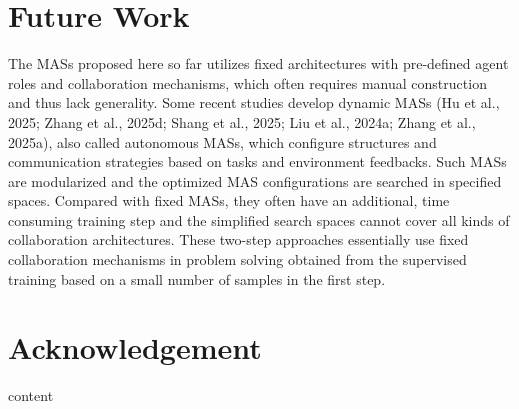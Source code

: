 \documentclass[conference]{IEEEtran}
\begin{document}
\section{Future Work}
The MASs proposed here so far utilizes fixed architectures with pre-defined agent roles and collaboration mechanisms, which often requires manual construction and thus lack generality.
Some recent studies develop dynamic MASs (Hu et al., 2025; Zhang et al., 2025d; Shang et al., 2025; Liu et al., 2024a; Zhang et 
al., 2025a), also called autonomous MASs, which configure structures and communication strategies based on tasks
and environment feedbacks. Such MASs are modularized and the optimized MAS configurations
are searched in specified spaces. Compared with
fixed MASs, they often have an additional, time consuming training step and the simplified search
spaces cannot cover all kinds of collaboration architectures. These two-step approaches essentially use
fixed collaboration mechanisms in problem solving
obtained from the supervised training based on a
small number of samples in the first step.
\section{Acknowledgement}
content

\end{document}
